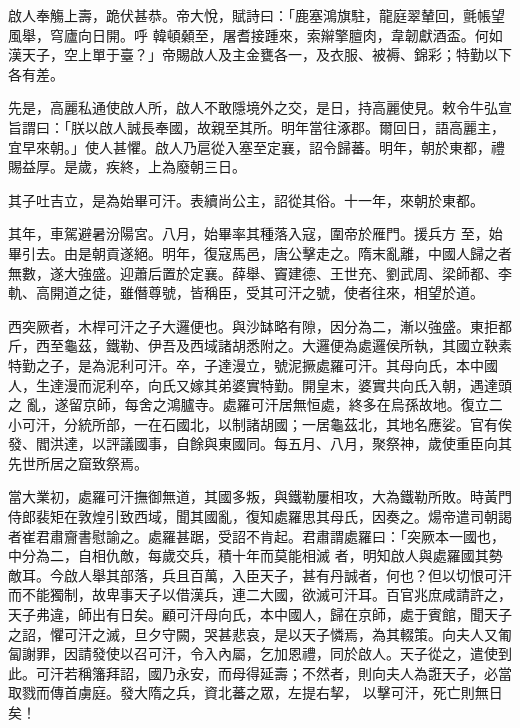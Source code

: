 \begin{pinyinscope}
 啟人奉觴上壽，跪伏甚恭。帝大悅，賦詩曰：「鹿塞鴻旗駐，龍庭翠輦回，氈帳望風舉，穹廬向日開。呼
 韓頓顙至，屠耆接踵來，索辮擎膻肉，韋韌獻酒盃。何如漢天子，空上單于臺？」帝賜啟人及主金甕各一，及衣服、被褥、錦彩；特勤以下各有差。



 先是，高麗私通使啟人所，啟人不敢隱境外之交，是日，持高麗使見。敕令牛弘宣旨謂曰：「朕以啟人誠長奉國，故親至其所。明年當往涿郡。爾回日，語高麗主，宜早來朝。」使人甚懼。啟人乃扈從入塞至定襄，詔令歸蕃。明年，朝於東都，禮賜益厚。是歲，疾終，上為廢朝三日。



 其子吐吉立，是為始畢可汗。表續尚公主，詔從其俗。十一年，來朝於東都。



 其年，車駕避暑汾陽宮。八月，始畢率其種落入寇，圍帝於雁門。援兵方
 至，始畢引去。由是朝貢遂絕。明年，復寇馬邑，唐公擊走之。隋末亂離，中國人歸之者無數，遂大強盛。迎蕭后置於定襄。薛舉、竇建德、王世充、劉武周、梁師都、李軌、高開道之徒，雖僭尊號，皆稱臣，受其可汗之號，使者往來，相望於道。



 西突厥者，木桿可汗之子大邏便也。與沙缽略有隙，因分為二，漸以強盛。東拒都斤，西至龜茲，鐵勒、伊吾及西域諸胡悉附之。大邏便為處邏侯所執，其國立鞅素特勤之子，是為泥利可汗。卒，子達漫立，號泥撅處羅可汗。其母向氏，本中國人，生達漫而泥利卒，向氏又嫁其弟婆實特勤。開皇末，婆實共向氏入朝，遇達頭之
 亂，遂留京師，每舍之鴻臚寺。處羅可汗居無恒處，終多在烏孫故地。復立二小可汗，分統所部，一在石國北，以制諸胡國；一居龜茲北，其地名應娑。官有俟發、閻洪達，以評議國事，自餘與東國同。每五月、八月，聚祭神，歲使重臣向其先世所居之窟致祭焉。



 當大業初，處羅可汗撫御無道，其國多叛，與鐵勒屢相攻，大為鐵勒所敗。時黃門侍郎裴矩在敦煌引致西域，聞其國亂，復知處羅思其母氏，因奏之。煬帝遣司朝謁者崔君肅齎書慰諭之。處羅甚踞，受詔不肯起。君肅謂處羅曰：「突厥本一國也，中分為二，自相仇敵，每歲交兵，積十年而莫能相滅
 者，明知啟人與處羅國其勢敵耳。今啟人舉其部落，兵且百萬，入臣天子，甚有丹誠者，何也？但以切恨可汗而不能獨制，故卑事天子以借漢兵，連二大國，欲滅可汗耳。百官兆庶咸請許之，天子弗違，師出有日矣。顧可汗母向氏，本中國人，歸在京師，處于賓館，聞天子之詔，懼可汗之滅，旦夕守闕，哭甚悲哀，是以天子憐焉，為其輟策。向夫人又匍匐謝罪，因請發使以召可汗，令入內屬，乞加恩禮，同於啟人。天子從之，遣使到此。可汗若稱籓拜詔，國乃永安，而母得延壽；不然者，則向夫人為誑天子，必當取戮而傳首虜庭。發大隋之兵，資北蕃之眾，左提右挈，
 以擊可汗，死亡則無日矣！




\end{pinyinscope}
